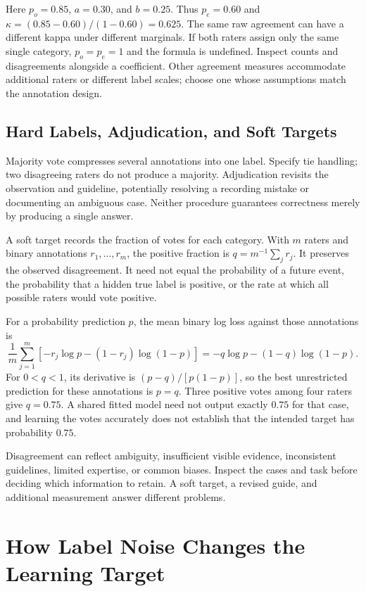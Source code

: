 Here $p_o=0.85$, $a=0.30$, and $b=0.25$. Thus $p_e=0.60$ and $\kappa=(0.85-0.60)/(1-0.60)=0.625$. The same raw agreement can have a different kappa under different marginals. If both raters assign only the same single category, $p_o=p_e=1$ and the formula is undefined. Inspect counts and disagreements alongside a coefficient. Other agreement measures accommodate additional raters or different label scales; choose one whose assumptions match the annotation design.

\subsection{Hard Labels, Adjudication, and Soft Targets}
\label{sec:soft-labels}

Majority vote compresses several annotations into one label. Specify tie handling; two disagreeing raters do not produce a majority. Adjudication revisits the observation and guideline, potentially resolving a recording mistake or documenting an ambiguous case. Neither procedure guarantees correctness merely by producing a single answer.

A soft target records the fraction of votes for each category. With $m$ raters and binary annotations $r_1,\ldots,r_m$, the positive fraction is $q=m^{-1}\sum_jr_j$. It preserves the observed disagreement. It need not equal the probability of a future event, the probability that a hidden true label is positive, or the rate at which all possible raters would vote positive.

For a probability prediction $p$, the mean binary log loss against those annotations is
\[
\frac1m\sum_{j=1}^m[-r_j\log p-(1-r_j)\log(1-p)]
=-q\log p-(1-q)\log(1-p).
\]
For $0<q<1$, its derivative is $(p-q)/[p(1-p)]$, so the best unrestricted prediction for these annotations is $p=q$. Three positive votes among four raters give $q=0.75$. A shared fitted model need not output exactly $0.75$ for that case, and learning the votes accurately does not establish that the intended target has probability $0.75$.

Disagreement can reflect ambiguity, insufficient visible evidence, inconsistent guidelines, limited expertise, or common biases. Inspect the cases and task before deciding which information to retain. A soft target, a revised guide, and additional measurement answer different problems.

\section{How Label Noise Changes the Learning Target}
\label{sec:label-noise}

